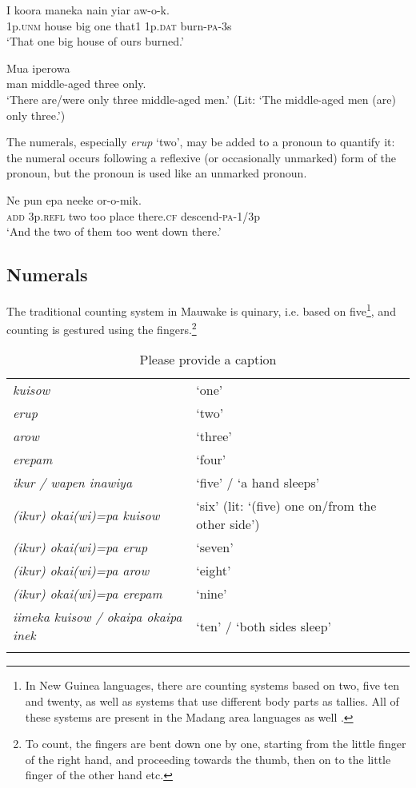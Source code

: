 \ea%
\label{ex:3:x87}
\gll I koora maneka  nain yiar aw-o-k. \\
1p.\textsc{unm} house big one that1 1p.\textsc{dat} burn-\textsc{pa}-3s\\
\glt`That one big house of ours burned.'
\z

\ea%
\label{ex:3:x442}
\gll Mua iperowa   \\
man middle-aged three only.\\
\glt`There are/were only three middle-aged men.' (Lit: `The middle-aged men (are) only three.') 
\z

The numerals, especially \textit{erup} `two', may be added to a pronoun to quantify it: the numeral occurs following a reflexive (or occasionally unmarked) form of the pronoun, but the pronoun is used like an unmarked pronoun.

\ea%
\label{ex:3:x89}
\gll Ne   pun epa neeke or-o-mik. \\
\textsc{add} 3p.\textsc{refl} two too place there.\textsc{cf} descend-\textsc{pa}-1/3p\\
\glt`And the two of them too went down there.'
\z

\subsection{Numerals}\label{sec:3.4.1}
{}
The traditional counting system in Mauwake is quinary, i.e. based on five\footnote{In New Guinea languages, there are counting systems based on two, five ten and twenty, as well as systems that use different body parts as tallies. All of these systems are present in the Madang area languages as well \citep{Lean1991}.}, and counting is gestured using the fingers.\footnote{To count, the fingers are bent down one by one, starting from the little finger of the right hand, and proceeding towards the thumb, then on to the little finger of the other hand etc.} 

\begin{table}
\caption{Please provide a caption}
\label{} 
\begin{tabular}{>{\itshape}ll}
\mytoprule
kuisow &`one'\\
erup &`two'\\
arow &`three'\\
erepam &`four'\\
ikur / wapen inawiya &`five' / `a hand sleeps'\\
(ikur) okai(wi)=pa kuisow &`six' (lit: `(five) one on/from the other side')\\
(ikur) okai(wi)=pa erup &`seven'\\
(ikur) okai(wi)=pa arow &`eight'\\
(ikur) okai(wi)=pa erepam &`nine'\\
iimeka kuisow / okaipa okaipa inek &`ten' / `both sides sleep'\\
\mybottomrule
\end{tabular}
\end{table}


